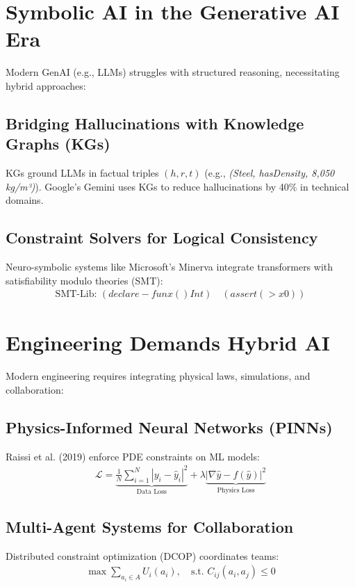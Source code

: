 \documentclass[12pt]{article}
\begin{document}
\section{Symbolic AI in the Generative AI Era}
\label{sec:genai}
Modern GenAI (e.g., LLMs) struggles with structured reasoning, necessitating hybrid approaches:

\subsection{Bridging Hallucinations with Knowledge Graphs (KGs)}
KGs ground LLMs in factual triples \((h, r, t)\) (e.g., \textit{(Steel, hasDensity, 8,050 kg/m³)}). Google’s Gemini uses KGs to reduce hallucinations by 40\% in technical domains.

\subsection{Constraint Solvers for Logical Consistency}
Neuro-symbolic systems like Microsoft’s Minerva integrate transformers with satisfiability modulo theories (SMT):
\begin{align}
\text{SMT-Lib: } (declare-fun x () Int) \quad (assert (> x 0))
\end{align}

\section{Engineering Demands Hybrid AI}
\label{sec:engineering}
Modern engineering requires integrating physical laws, simulations, and collaboration:

\subsection{Physics-Informed Neural Networks (PINNs)}
Raissi et al. (2019) enforce PDE constraints on ML models:
\begin{align}
\mathcal{L} = \underbrace{\frac{1}{N} \sum_{i=1}^N |y_i - \hat{y}_i|^2}_{\text{Data Loss}} + \lambda \underbrace{|\nabla \hat{y} - f(\hat{y})|^2}_{\text{Physics Loss}}
\end{align}

\subsection{Multi-Agent Systems for Collaboration}
Distributed constraint optimization (DCOP) coordinates teams:
\begin{align}
\max \sum_{a_i \in A} U_i(a_i), \quad \text{s.t. } C_{ij}(a_i, a_j) \leq 0
\end{align}
\end{document}
